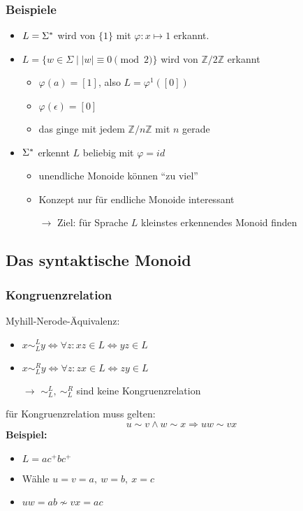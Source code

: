     \subsubsection{Beispiele}
        \begin{itemize}
            \item $L=\Sigma^*$ wird von $\{1\}$ mit $\varphi:x\mapsto 1$ erkannt.
            \item $L=\{w\in\Sigma\mid |w|\equiv 0\pmod 2\}$ wird von $\mathds{Z}/2\mathds{Z}$ erkannt
            \begin{itemize}
                \item $\varphi(a)=[1]$, also $L=\varphi^{1}([0])$
                \item $\varphi(\epsilon)=[0]$
                \item das ginge mit jedem $\mathds{Z}/n\mathds{Z}$ mit $n$ gerade
            \end{itemize}
            \item $\Sigma^*$ erkennt $L$ beliebig mit $\varphi=id$
            \begin{itemize}
                \item unendliche Monoide können ``zu viel''
                \item Konzept nur für endliche Monoide interessant
                \item[$\rightarrow$] Ziel: für Sprache $L$ kleinstes erkennendes Monoid finden
            \end{itemize}
        \end{itemize}
    \subsection{Das syntaktische Monoid}
        \subsubsection{Kongruenzrelation}
            Myhill-Nerode-Äquivalenz:
            \begin{itemize}
                \item $x\sim^L_L y\Leftrightarrow\forall z:xz\in L\Leftrightarrow yz\in L$
                \item $x\sim^R_L y\Leftrightarrow\forall z:zx\in L\Leftrightarrow zy\in L$
                \item[$\rightarrow$] $\sim^L_L,\ \sim^R_L$ sind keine Kongruenzrelation
            \end{itemize}
            für Kongruenzrelation muss gelten:
            $$u\sim v\wedge w\sim x\Rightarrow uw\sim vx$$
            \textbf{Beispiel:}
            \begin{itemize}
                \item $L=ac^+bc^+$
                \item Wähle $u=v=a,\ w=b,\ x=c$
                \item $uw=ab\not\sim vx=ac$
            \end{itemize}

